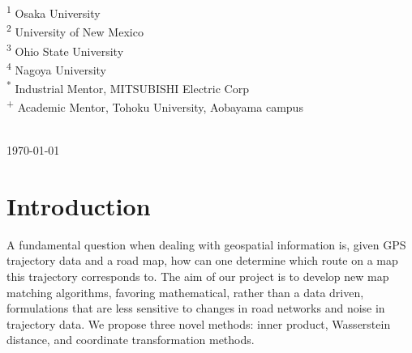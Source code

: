 \documentclass{article}
\numberwithin{equation}{section}
\theoremstyle{definition}
\begin{document}
\begin{titlepage}
\begin{minipage}{0.35\textwidth}
\begin{flushleft}
\textsuperscript{1} Osaka University\\
\textsuperscript{2} University of New Mexico\\
\textsuperscript{3} Ohio State University \\
\textsuperscript{4} Nagoya University \\
\textsuperscript{*} Industrial Mentor, MITSUBISHI Electric Corp \\
\textsuperscript{+} Academic Mentor, Tohoku University, Aobayama campus \\

\end{flushleft}
\end{minipage}\\[2cm]



{\large \today}\\[2cm] %


 

\vfill %

\end{titlepage}

\tableofcontents \newpage

\section{Introduction}
A fundamental question when dealing with geospatial information is, given GPS trajectory data and a road map, how can one determine which route on a map this trajectory corresponds to. The aim of our project is to develop new map matching algorithms, favoring mathematical, rather than a data driven, formulations that are less sensitive to changes in road networks and noise in trajectory data. We propose three novel methods: inner product, Wasserstein distance, and coordinate transformation methods.   
\end{document}
